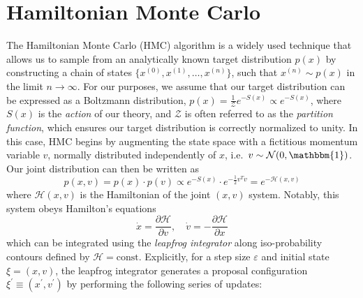 \documentclass{article} %
\begin{document}
\section{\label{sec:HMC}Hamiltonian Monte Carlo}
%
The Hamiltonian Monte Carlo (HMC) algorithm is a widely used technique that allows us to sample from an analytically
known target distribution \(p(x)\) by constructing a chain of states \(\{x^{(0)},
x^{(1)}, \ldots, x^{(n)}\}\), such that \(x^{(n)}\sim p(x)\) in the limit
\(n\rightarrow\infty\).
%
For our purposes, we assume that our target distribution can be expressed as a Boltzmann distribution, \(p(x) =
\tfrac{1}{\mathcal{Z}} e^{-S(x)}\propto e^{-S(x)}\), where \(S(x)\) is the \emph{action} of our
theory, and \(\mathcal{Z}\) is often referred to as the \emph{partition function}, which ensures our target distribution
is correctly normalized to unity.
%
In this case, HMC begins by augmenting the state space with a fictitious momentum variable \(v\), normally
distributed independently of \(x\), i.e.\ \(v\sim\mathcal{N}(0, \mathbbm{1})\).
%
Our joint distribution can then be written as
%
\begin{equation}
   p(x, v) = p(x)\cdot p(v) \propto e^{-S(x)}\cdot e^{-\frac{1}{2}v^{T}v} = e^{-\mathcal{H}(x, v)}
\end{equation}
%
where \(\mathcal{H}(x, v)\) is the Hamiltonian of the joint \((x, v)\) system.
%
Notably, this system obeys Hamilton's equations
%
\begin{equation}
   \dot{x} = \frac{\partial\mathcal{H}}{\partial v},\quad \dot{v} = -\frac{\partial\mathcal{H}}{\partial x}
\end{equation}
%
which can be integrated using the \emph{leapfrog integrator} along iso-probability contours defined by \(\mathcal{H} =
\text{const}\).
%
Explicitly, for a step size \(\varepsilon\) and initial state \(\xi = (x, v)\), the leapfrog integrator generates a
proposal configuration \(\xi^{\prime} \equiv (x^{\prime}, v^{\prime})\) by performing the following series of updates: 
%
\end{document}
